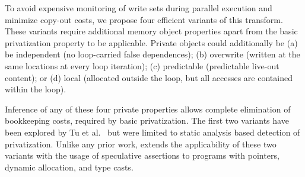 To avoid expensive monitoring of write sets during parallel execution
and minimize copy-out costs, we propose four efficient variants of
this transform.
%
These variants require additional memory object properties apart from the basic
privatization property to be applicable.  Private
objects could additionally be (a) be independent (no loop-carried false
dependences); (b) overwrite (written at the same locations at every
loop iteration); (c) predictable (predictable live-out content);
or (d) local (allocated outside the loop, but all accesses are
contained within the loop).

Inference of any of these four private properties allows complete
elimination of bookkeeping costs, required by basic privatization.
The first two variants have been explored by Tu et
al.~\cite{tu:94:lcpc} but were limited to static analysis based
detection of privatization. Unlike any prior work, \name extends
the applicability of these two variants with the usage of speculative
assertions to programs with pointers, dynamic allocation, and type
casts.





\lstset{basicstyle=\ttfamily, numbers=left, numberstyle=\tiny,
  stepnumber=1, numbersep=5pt}


